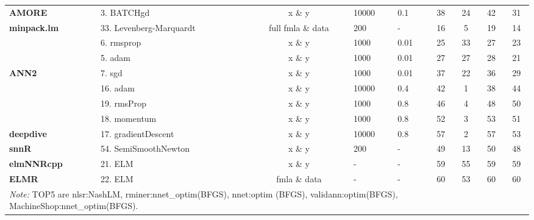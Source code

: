 \begin{Schunk}
\begin{table}[!h]
\begin{tabular}[t]{>{}llcllcccc}
\multirow{-4}{*}{\raggedright\arraybackslash \textbf{AMORE}} & 3. BATCHgd & x \& y & 10000 & 0.1 & 38 & 24 & 42 & 31\\
\cmidrule{1-9}
\textbf{minpack.lm} & 33. Levenberg-Marquardt & full fmla \& data & 200 & - & 16 & 5 & 19 & 14\\
\cmidrule{1-9}
 & 6. rmsprop & x \& y & 1000 & 0.01 & 25 & 33 & 27 & 23\\

 & 5. adam & x \& y & 1000 & 0.01 & 27 & 27 & 28 & 21\\

\multirow{-3}{*}{\raggedright\arraybackslash \textbf{ANN2}} & 7. sgd & x \& y & 1000 & 0.01 & 37 & 22 & 36 & 29\\
\cmidrule{1-9}
 & 16. adam & x \& y & 10000 & 0.4 & 42 & 1 & 38 & 44\\

 & 19. rmsProp & x \& y & 1000 & 0.8 & 46 & 4 & 48 & 50\\

 & 18. momentum & x \& y & 1000 & 0.8 & 52 & 3 & 53 & 51\\

\multirow{-4}{*}{\raggedright\arraybackslash \textbf{deepdive}} & 17. gradientDescent & x \& y & 10000 & 0.8 & 57 & 2 & 57 & 53\\
\cmidrule{1-9}
\textbf{snnR} & 54. SemiSmoothNewton & x \& y & 200 & - & 49 & 13 & 50 & 48\\
\cmidrule{1-9}
\textbf{elmNNRcpp} & 21. ELM & x \& y & - & - & 59 & 55 & 59 & 59\\
\cmidrule{1-9}
\textbf{ELMR} & 22. ELM & fmla \& data & - & - & 60 & 53 & 60 & 60\\
\bottomrule
\multicolumn{9}{l}{\rule{0pt}{1em}\textit{Note: } TOP5 are nlsr:NashLM, rminer:nnet\_optim(BFGS), nnet:optim (BFGS), validann:optim(BFGS), MachineShop:nnet\_optim(BFGS).}\\
\end{tabular}
\end{table}

\end{Schunk}

